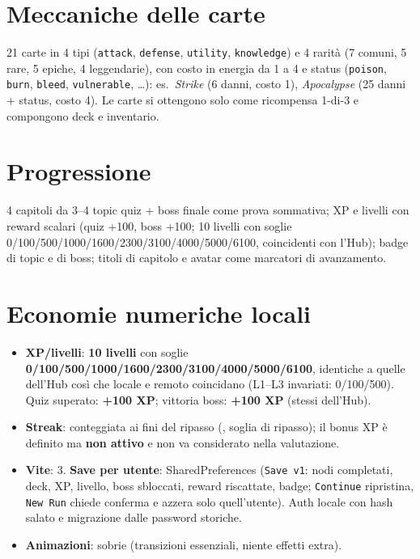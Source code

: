 \section{Meccaniche delle carte}
21 carte in 4 tipi (\texttt{attack}, \texttt{defense}, \texttt{utility},
\texttt{knowledge}) e 4 rarit\`a (7 comuni, 5 rare, 5 epiche, 4
leggendarie), con costo in energia da 1 a 4 e status
(\texttt{poison}, \texttt{burn}, \texttt{bleed}, \texttt{vulnerable},
\dots): es.\ \textit{Strike} (6 danni, costo 1),
\textit{Apocalypse} (25 danni + status, costo 4). Le carte si ottengono
solo come ricompensa 1-di-3 e compongono deck e inventario.

\section{Progressione}
4 capitoli da 3--4 topic quiz + boss finale come prova sommativa;
XP e livelli con reward scalari (quiz +100, boss +100; 10 livelli con
soglie 0/100/500/1000/1600/2300/3100/4000/5000/6100, coincidenti con
l'Hub); badge di topic e di boss; titoli di capitolo e
avatar come marcatori di avanzamento.

\section{Economie numeriche locali}
\begin{itemize}
\item \textbf{XP/livelli}: \textbf{10 livelli} con soglie
\textbf{0/100/500/1000/1600/2300/3100/4000/5000/6100}, identiche
a quelle dell'Hub cos\`i che locale e remoto coincidano (L1--L3
invariati: 0/100/500). Quiz superato:
\textbf{+100 XP}; vittoria boss: \textbf{+100 XP} (stessi dell'Hub).
\item \textbf{Streak}: conteggiata ai fini del ripasso
(, soglia di ripasso); il bonus XP \`e definito ma
\textbf{non attivo} e non va considerato nella valutazione.
\item \textbf{Vite}: 3. \textbf{Save per utente}: SharedPreferences
(\texttt{Save v1}: nodi completati, deck, XP, livello, boss sbloccati,
reward riscattate, badge; \texttt{Continue} ripristina,
\texttt{New Run} chiede conferma e azzera solo quell'utente).
Auth locale con hash salato e migrazione dalle password storiche.
\item \textbf{Animazioni}: sobrie (transizioni essenziali, niente effetti
extra).
\end{itemize}
